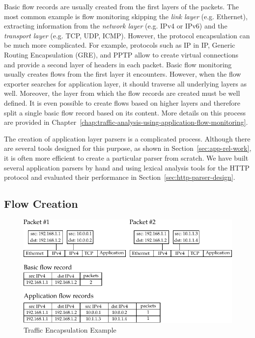 Basic flow records are usually created from the first layers of the packets. The most common example is flow monitoring skipping the \emph{link layer} (e.g. Ethernet), extracting information from the \emph{network layer} (e.g. IPv4 or IPv6) and the \emph{transport layer} (e.g. TCP, UDP, ICMP). However, the protocol encapsulation can be much more complicated. For example, protocols such as IP in IP, Generic Routing Encapsulation (GRE), and PPTP allow to create virtual connections and provide a second layer of headers in each packet. Basic flow monitoring usually creates flows from the first layer it encounters. However, when the flow exporter searches for application layer, it should traverse all underlying layers as well. Moreover, the layer from which the flow records are created must be well defined. It is even possible to create flows based on higher layers and therefore split a single basic flow record based on its content. More details on this process are provided in Chapter~\ref{chap:traffic-analysis-using-application-flow-monitoring}.

The creation of application layer parsers is a complicated process. Although there are several tools designed for this purpose, as shown in Section~\ref{sec:app-rel-work}, it is often more efficient to create a particular parser from scratch. We have built several application parsers by hand and using lexical analysis tools for the HTTP protocol and evaluated their performance in Section~\ref{sec:http-parser-design}.

\subsection{Flow Creation}

\begin{figure}[t!]
  \begin{center}
    \includegraphics[]{figures/encapsulation}
  \end{center}
  \caption{Traffic Encapsulation Example}
  \label{fig:encapsulation}
\end{figure}


